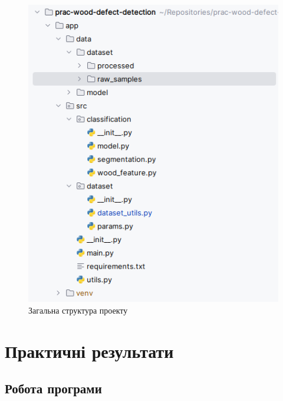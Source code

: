\documentclass[oneside,14pt]{extarticle}
\begin{document}
\begin{figure}[H]
	\centering
	\includegraphics[scale=0.9]{1}
	\caption{Загальна структура проекту}
\end{figure}

\section{Практичні результати}

\subsection{Робота програми}
\end{document}
